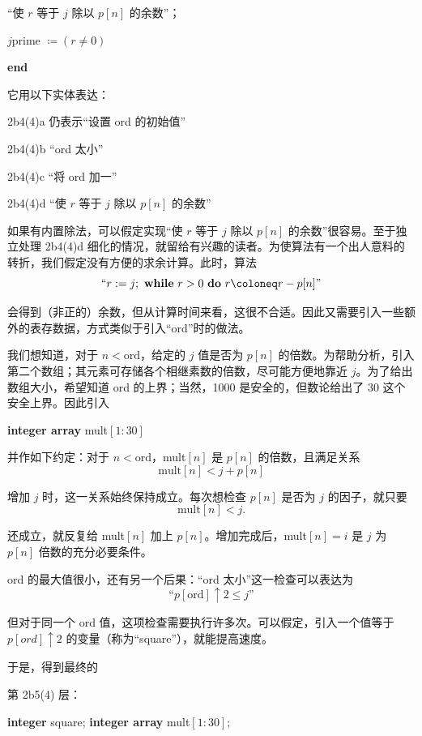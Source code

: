 \noindent
\quad “使 $r$ 等于 $j$ 除以 $p[n]$ 的余数”；

\noindent
\quad $j$prime $\coloneq (r \neq 0)$

\noindent
\textbf{end}

\noindent
它用以下实体表达：

\noindent
2b4(4)a\tabto{5em} 仍表示“设置 ord 的初始值”

\noindent
2b4(4)b\tabto{5em} “ord 太小”

\noindent
2b4(4)c\tabto{5em} “将 ord 加一”

\noindent
2b4(4)d\tabto{5em} “使 $r$ 等于 $j$ 除以 $p[n]$ 的余数”

如果有内置除法，可以假定实现“使 $r$ 等于 $j$ 除以 $p[n]$ 的余数”很容易。至于独立处理 2b4(4)d 细化的情况，就留给有兴趣的读者。为使算法有一个出人意料的转折，我们假定没有方便的求余计算。此时，算法
$$
\text{``}r: = j;\text{ \textbf{while} } r > 0\text{ \textbf{do} } r \coloneq r - p[n]\text{''}
$$

\noindent
会得到（非正的）余数，但从计算时间来看，这很不合适。因此又需要引入一些额外的表存数据，方式类似于引入“ord”时的做法。

我们想知道，对于 $n < \text{ord}$，给定的 $j$ 值是否为 $p[n]$ 的倍数。为帮助分析，引入第二个数组；其元素可存储各个相继素数的倍数，尽可能方便地靠近 $j$。为了给出数组大小，希望知道 ord 的上界；当然，1000 是安全的，但数论给出了 30 这个安全上界。因此引入

\noindent
\textbf{integer array} mult$[1 : 30]$

\noindent
并作如下约定：对于 $n < \text{ord}$，mult$[n]$ 是 $p[n]$ 的倍数，且满足关系
$$
\text{mult}[n] < j + p[n]
$$

\noindent
增加 $j$ 时，这一关系始终保持成立。每次想检查 $p[n]$ 是否为 $j$ 的因子，就只要
$$
\text{mult}[n] < j.
$$

\noindent
还成立，就反复给 mult$[n]$ 加上 $p[n]$。增加完成后，mult$[n] = i$ 是 $j$ 为 $p[n]$ 倍数的充分必要条件。

ord 的最大值很小，还有另一个后果：“ord 太小”这一检查可以表达为
$$
\text{``}p[\text{ord}] \uparrow 2 \leqslant j\text{''}
$$

\noindent
但对于同一个 ord 值，这项检查需要执行许多次。可以假定，引入一个值等于 $p[ord] \uparrow 2$ 的变量（称为“square”），就能提高速度。

于是，得到最终的

\noindent
第 2b5(4) 层：

\noindent
\textbf{integer} square; \textbf{integer array} mult$[1 : 30]$;

